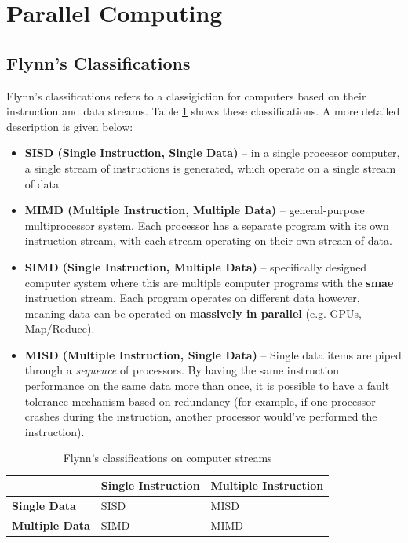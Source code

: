 \documentclass{article}
\begin{document}
\section{Parallel Computing}

\subsection{Flynn's Classifications}

Flynn's classifications refers to a classigiction for computers based on their instruction and data streams. Table \ref{tab:flynn} shows these classifications. A more detailed description is given below:
\begin{itemize}
	\item \textbf{SISD (Single Instruction, Single Data)} -- in a single processor computer, a single stream of instructions is generated, which operate on a single stream of data
	\item \textbf{MIMD (Multiple Instruction, Multiple Data)} -- general-purpose multiprocessor system. Each processor has a separate program with its own instruction stream, with each stream operating on their own stream of data. 
	\item \textbf{SIMD (Single Instruction, Multiple Data)} -- specifically designed computer system where this are multiple computer programs with the \textbf{smae} instruction stream. Each program operates on different data however, meaning data can be operated on \textbf{massively in parallel} (e.g. GPUs, Map/Reduce).
	\item \textbf{MISD (Multiple Instruction, Single Data)} -- Single data items are piped through a \textit{sequence} of processors. By having the same instruction performance on the same data more than once, it is possible to have a fault tolerance mechanism based on redundancy (for example, if one processor crashes during the instruction, another processor would've performed the instruction).
\end{itemize}

\begin{table}
	\centering
	\begin{tabular}{|l|l|l|}
		\hline
		& \textbf{Single Instruction} & \textbf{Multiple Instruction} \\
		\hline
		\textbf{Single Data} & SISD & MISD \\
		\hline
		\textbf{Multiple Data} & SIMD & MIMD \\
		\hline
	\end{tabular}
	\caption{Flynn's classifications on computer streams}
	\label{tab:flynn}	
\end{table}
\end{document}
